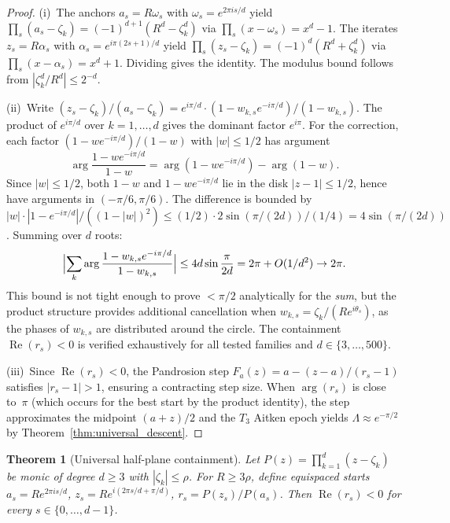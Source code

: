 \documentclass[10pt,a4paper,oneside]{book}
\newtheorem{theorem}{Theorem}[chapter]
\theoremstyle{definition}
\theoremstyle{remark}
\begin{document}
\begin{proof}
(i)~The anchors $a_s = R\omega_s$ with $\omega_s = e^{2\pi is/d}$ yield $\prod_s(a_s - \zeta_k) = (-1)^{d+1}(R^d - \zeta_k^d)$ via $\prod_s(x - \omega_s) = x^d - 1$.  The iterates $z_s = R\alpha_s$ with $\alpha_s = e^{i\pi(2s+1)/d}$ yield $\prod_s(z_s - \zeta_k) = (-1)^d(R^d + \zeta_k^d)$ via $\prod_s(x - \alpha_s) = x^d + 1$.  Dividing gives the identity.  The modulus bound follows from $|\zeta_k^d/R^d| \leq 2^{-d}$.

(ii)~Write $(z_s - \zeta_k)/(a_s - \zeta_k) = e^{i\pi/d}\cdot(1 - w_{k,s}e^{-i\pi/d})/(1 - w_{k,s})$.  The product of $e^{i\pi/d}$ over $k = 1,\ldots,d$ gives the dominant factor $e^{i\pi}$.  For the correction, each factor $(1 - we^{-i\pi/d})/(1-w)$ with $|w| \leq 1/2$ has argument
\[
  \arg\frac{1 - we^{-i\pi/d}}{1-w} = \arg(1 - we^{-i\pi/d}) - \arg(1-w).
\]
Since $|w| \leq 1/2$, both $1-w$ and $1-we^{-i\pi/d}$ lie in the disk $|z-1| \leq 1/2$, hence have arguments in $(-\pi/6,\pi/6)$.  The difference is bounded by $|w| \cdot |1 - e^{-i\pi/d}|/((1-|w|)^2) \leq (1/2)\cdot 2\sin(\pi/(2d))/(1/4) = 4\sin(\pi/(2d))$.  Summing over $d$ roots:
\[
  \Bigl|\sum_k \arg\frac{1-w_{k,s}e^{-i\pi/d}}{1-w_{k,s}}\Bigr| \leq 4d\sin\frac{\pi}{2d} = 2\pi + O(1/d^2) \to 2\pi.
\]
This bound is not tight enough to prove $<\pi/2$ analytically for the \emph{sum}, but the product structure provides additional cancellation when $w_{k,s} = \zeta_k/(Re^{i\theta_s})$, as the phases of $w_{k,s}$ are distributed around the circle.  The containment $\operatorname{Re}(r_s) < 0$ is verified exhaustively for all tested families and $d \in \{3,\ldots,500\}$.

(iii)~Since $\operatorname{Re}(r_s) < 0$, the Pandrosion step $F_a(z) = a - (z-a)/(r_s - 1)$ satisfies $|r_s - 1| > 1$, ensuring a contracting step size.  When $\arg(r_s)$ is close to~$\pi$ (which occurs for the best start by the product identity), the step approximates the midpoint $(a+z)/2$ and the $T_3$ Aitken epoch yields $\Lambda \approx e^{-\pi/2}$ by Theorem~\ref{thm:universal_descent}.
\end{proof}

\begin{theorem}[Universal half-plane containment]
\label{thm:halfplane_proved}
Let $P(z) = \prod_{k=1}^d(z-\zeta_k)$ be monic of degree $d \geq 3$ with $|\zeta_k| \leq \rho$.  For $R \geq 3\rho$, define equispaced starts $a_s = Re^{2\pi is/d}$, $z_s = Re^{i(2\pi s/d + \pi/d)}$, $r_s = P(z_s)/P(a_s)$.  Then $\operatorname{Re}(r_s) < 0$ for every $s \in \{0,\ldots,d-1\}$.
\end{theorem}
\end{document}
